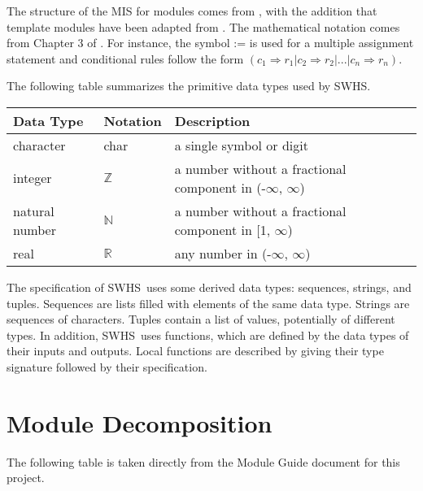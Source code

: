 \documentclass[12pt, titlepage]{article}
\newcommand{\progname}{SWHS}
\begin{document}
The structure of the MIS for modules comes from \citet{HoffmanAndStrooper1995},
with the addition that template modules have been adapted from
\cite{GhezziEtAl2003}.  The mathematical notation comes from Chapter 3 of
\citet{HoffmanAndStrooper1995}.  For instance, the symbol := is used for a
multiple assignment statement and conditional rules follow the form $(c_1
\Rightarrow r_1 | c_2 \Rightarrow r_2 | ... | c_n \Rightarrow r_n )$.

The following table summarizes the primitive data types used by \progname. 

\begin{center}
\renewcommand{\arraystretch}{1.2}
\noindent 
\begin{tabular}{l l p{7.5cm}} 
\toprule 
\textbf{Data Type} & \textbf{Notation} & \textbf{Description}\\ 
\midrule
character & char & a single symbol or digit\\
integer & $\mathbb{Z}$ & a number without a fractional component in (-$\infty$, $\infty$) \\
natural number & $\mathbb{N}$ & a number without a fractional component in [1, $\infty$) \\
real & $\mathbb{R}$ & any number in (-$\infty$, $\infty$)\\
\bottomrule
\end{tabular} 
\end{center}

\noindent
The specification of \progname \ uses some derived data types: sequences, strings, and
tuples. Sequences are lists filled with elements of the same data type. Strings
are sequences of characters. Tuples contain a list of values, potentially of
different types. In addition, \progname \ uses functions, which
are defined by the data types of their inputs and outputs. Local functions are
described by giving their type signature followed by their specification.

\section{Module Decomposition}

The following table is taken directly from the Module Guide document for this project.
\end{document}
